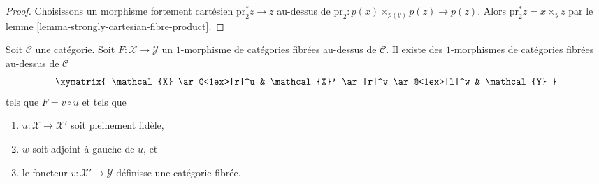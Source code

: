 \begin{proof}
Choisissons un morphisme fortement cartésien
$\text{pr}_2^*z \to z$ au-dessus de
$\text{pr}_2 : p(x) \times_{p(y)} p(z) \to p(z)$. Alors
$\text{pr}_2^*z = x \times_y z$ par le
lemme \ref{lemma-strongly-cartesian-fibre-product}.
\end{proof}

\begin{lemma}
\label{lemma-ameliorate-morphism-fibred-categories}
Soit $\mathcal{C}$ une catégorie. Soit
$F : \mathcal{X} \to \mathcal{Y}$ un $1$-morphisme de catégories fibrées
au-dessus de $\mathcal{C}$.
Il existe des $1$-morphismes de catégories fibrées au-dessus de
$\mathcal{C}$
$$
\xymatrix{
\mathcal{X} \ar@<1ex>[r]^u &
\mathcal{X}' \ar[r]^v \ar@<1ex>[l]^w & \mathcal{Y}
}
$$
tels que $F = v \circ u$ et tels que
\begin{enumerate}
\item $u : \mathcal{X} \to \mathcal{X}'$ soit pleinement fidèle,
\item $w$ soit adjoint à gauche de $u$, et
\item le foncteur $v : \mathcal{X}' \to \mathcal{Y}$ définisse une
catégorie fibrée.
\end{enumerate}
\end{lemma}

